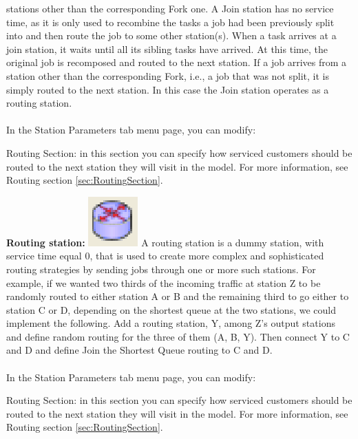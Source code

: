 \begin{enumerate*}
stations other than the corresponding Fork one. A Join station has
no service time, as it is only used to recombine the tasks a job
had been previously split into and then route the job to some
other station(s). When a task arrives at a join station, it waits
until all its sibling tasks have arrived. At this time, the
original job is
recomposed and routed to the next station. If a job arrives from a station other than the corresponding Fork, i.e., a job that was not split, it is simply routed to the next station. In this case the Join station operates as a routing station.\\\\
In the Station Parameters tab menu page, you can modify:
\begin{description*}
\item[Routing Section:] in this section you can specify how serviced customers should be routed to the next station they will visit in the model.
For more information, see Routing section \autoref{sec:RoutingSection}.
\end{description*}
\item \textbf{Routing station:}
\includegraphics[scale=0.5]{img/jsim/load_splitter.eps} A routing
station is a dummy station, with service time equal 0, that is
used to create more complex and sophisticated routing strategies
by sending jobs through one or more such stations. For example, if
we wanted two thirds of the incoming traffic at station Z to be
randomly routed to either station A or B and the remaining third
to go either to station C or D, depending on the shortest queue at
the two stations, we could implement the following. Add a routing
station, Y, among Z's output stations and define random routing
for the three of them (A, B, Y).
Then connect Y to C and D and define Join the Shortest Queue routing to C and D.\\\\
In the Station Parameters tab menu page, you can modify:
\begin{description*}
\item[Routing Section:] in this section you can specify how serviced customers should be routed to the next station they will visit in the model.
For more information, see Routing section \autoref{sec:RoutingSection}.
\end{description*}

\end{enumerate*}
